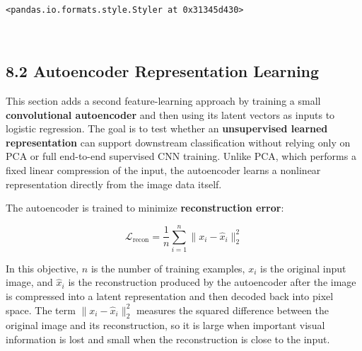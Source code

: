 \documentclass[11pt]{article}
\begin{document}
    \begin{center}
    \end{center}
    { \hspace*{\fill} \\}
    
    
    \begin{Verbatim}[commandchars=\\\{\}]
<pandas.io.formats.style.Styler at 0x31345d430>
    \end{Verbatim}

    
    \begin{center}
    \end{center}
    { \hspace*{\fill} \\}
    
    \subsection{8.2 Autoencoder Representation
Learning}\label{autoencoder-representation-learning}

This section adds a second feature-learning approach by training a small
\textbf{convolutional autoencoder} and then using its latent vectors as
inputs to logistic regression. The goal is to test whether an
\textbf{unsupervised learned representation} can support downstream
classification without relying only on PCA or full end-to-end supervised
CNN training. Unlike PCA, which performs a fixed linear compression of
the input, the autoencoder learns a nonlinear representation directly
from the image data itself.

The autoencoder is trained to minimize \textbf{reconstruction error}:

\[
\mathcal{L}_{\text{recon}} = \frac{1}{n} \sum_{i=1}^{n} \|x_i - \hat{x}_i\|_2^2
\]

In this objective, \(n\) is the number of training examples, \(x_i\) is
the original input image, and \(\hat{x}_i\) is the reconstruction
produced by the autoencoder after the image is compressed into a latent
representation and then decoded back into pixel space. The term
\(\|x_i - \hat{x}_i\|_2^2\) measures the squared difference between the
original image and its reconstruction, so it is large when important
visual information is lost and small when the reconstruction is close to
the input.
\end{document}
